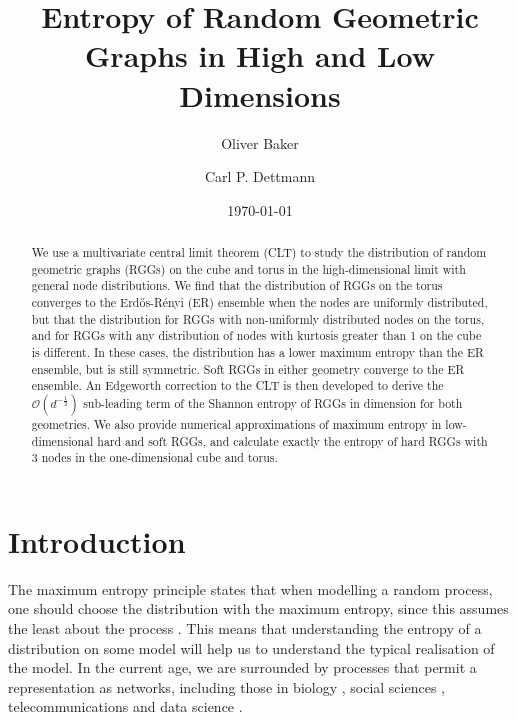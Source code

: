 \documentclass{article}
\title{Entropy of Random Geometric Graphs in High and Low Dimensions}
\author[1]{Oliver Baker}
\author[1]{Carl P. Dettmann}
\affil[1]{School of Mathematics, University of Bristol}
\date{\today}
\newcommand{\bigO}[1]{\mathcal{O}\left(#1\right)}
\begin{document}
\maketitle

\begin{abstract}
    We use a multivariate central limit theorem (CLT) to study the distribution of random geometric graphs (RGGs) on the cube and torus in the high-dimensional limit with general node distributions. We find that the distribution of RGGs on the torus converges to the Erd\H os-R\'enyi (ER) ensemble when the nodes are uniformly distributed, but that the distribution for RGGs with non-uniformly distributed nodes on the torus, and for RGGs with any distribution of nodes with kurtosis greater than 1 on the cube is different. In these cases, the distribution has a lower maximum entropy than the ER ensemble, but is still symmetric. Soft RGGs in either geometry converge to the ER ensemble. An Edgeworth correction to the CLT is then developed to derive the $\bigO{d^{-\frac{1}{2}}}$ sub-leading term of the Shannon entropy of RGGs in dimension for both geometries. We also provide numerical approximations of maximum entropy in low-dimensional hard and soft RGGs, and calculate exactly the entropy of hard RGGs with 3 nodes in the one-dimensional cube and torus. 
\end{abstract}

\newpage


\section{Introduction}
The maximum entropy principle states that when modelling a random process, one should choose the distribution with the maximum entropy, since this assumes the least about the process \cite{jaynes1982rationale}. This means that understanding the entropy of a distribution on some model will help us to understand the typical realisation of the model. In the current age, we are surrounded by processes that permit a representation as networks, including those in biology \cite{west2012differential}, social sciences \cite{marin2011social}, telecommunications \cite{haenggi2009stochastic} and data science \cite{zhang2022joint}. \newline
\end{document}
